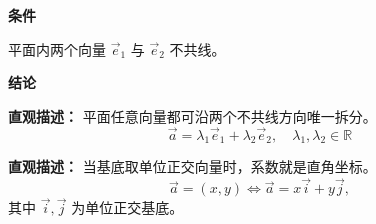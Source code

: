 \begin{statementbox}
	\textbf{\textcolor{CStatement}{条件}}
	\begin{description}[style=nextline, leftmargin=2.8em, labelsep=0.5em, itemsep=0.35em]
		\item[\textbf{\textcolor{CStatement}{条件1（基底条件）：}}]
			平面内两个向量 $\vec{e}_1$ 与 $\vec{e}_2$ 不共线。
	\end{description}
	\textbf{\textcolor{CStatement}{结论}}
	\begin{description}[style=nextline, leftmargin=2.8em, labelsep=0.5em, itemsep=0.45em]
		\item[\textbf{\textcolor{CStatement}{结论一（唯一分解）：}}]
			\textbf{\textcolor{CStatement}{直观描述：}}
			平面任意向量都可沿两个不共线方向唯一拆分。
			\[
				\vec{a} = \lambda_1 \vec{e}_1 + \lambda_2 \vec{e}_2, \quad \lambda_1,\lambda_2 \in \mathbb{R}
			\]
		\item[\textbf{\textcolor{CStatement}{常见变形（坐标表示）：}}]
			\textbf{\textcolor{CStatement}{直观描述：}}
			当基底取单位正交向量时，系数就是直角坐标。
			\[
				\vec{a} = (x,y) \iff \vec{a} = x\vec{i} + y\vec{j},
			\]
			其中 $\vec{i},\vec{j}$ 为单位正交基底。
	\end{description}

\end{statementbox}
